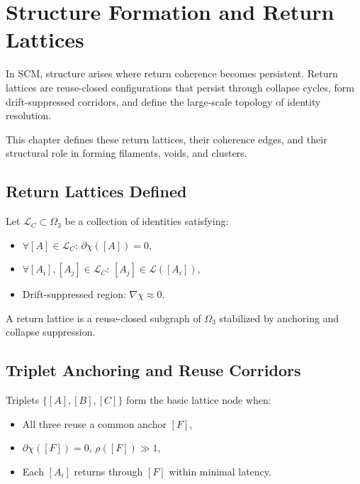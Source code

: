 \chapter{Structure Formation and Return Lattices} \label{chapter-structure-lattices}

In SCM, structure arises where return coherence becomes persistent. Return lattices are reuse-closed configurations that persist through collapse cycles, form drift-suppressed corridors, and define the large-scale topology of identity resolution.

This chapter defines these return lattices, their coherence edges, and their structural role in forming filaments, voids, and clusters.

\section{Return Lattices Defined} \label{sec:def-lattice}

Let $\mathcal{L}_C \subset \Omega_3$ be a collection of identities satisfying:

\begin{itemize}
  \item $\forall [A] \in \mathcal{L}_C$: $\partial\chi([A]) = 0$,
  \item $\forall [A_i], [A_j] \in \mathcal{L}_C$: $[A_j] \in \mathcal{L}([A_i])$,
  \item Drift-suppressed region: $\nabla\chi \approx 0$.
\end{itemize}

\begin{definition}
A return lattice is a reuse-closed subgraph of $\Omega_3$ stabilized by anchoring and collapse suppression.
\end{definition}

\section{Triplet Anchoring and Reuse Corridors} \label{sec:triplet-corridor}

Triplets $\{ [A], [B], [C] \}$ form the basic lattice node when:
\begin{itemize}
  \item All three reuse a common anchor $[F]$,
  \item $\partial\chi([F]) = 0$, $\rho([F]) \gg 1$,
  \item Each $[A_i]$ returns through $[F]$ within minimal latency.
\end{itemize}

